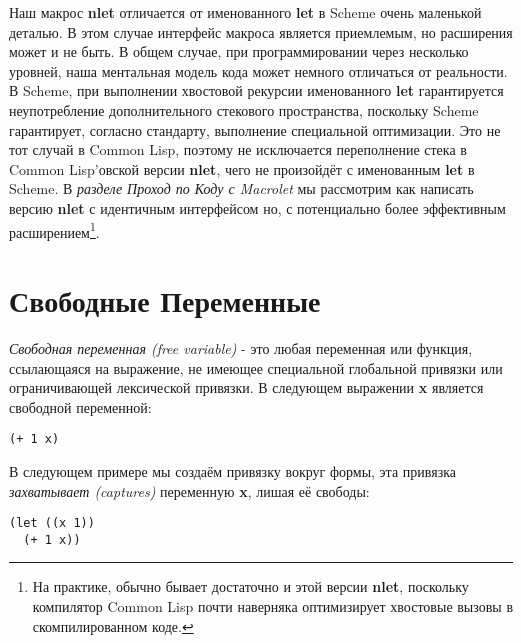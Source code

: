 Наш макрос \textbf{nlet} отличается от именованного \textbf{let} в Scheme очень маленькой деталью. В этом случае интерфейс макроса является приемлемым, но расширения может и не быть. В общем случае, при программировании через несколько уровней, наша ментальная модель кода может немного отличаться от реальности. В Scheme, при выполнении хвостовой рекурсии именованного \textbf{let} гарантируется неупотребление дополнительного стекового пространства, поскольку Scheme гарантирует, согласно стандарту, выполнение специальной оптимизации. Это не тот случай в Common Lisp, поэтому не исключается переполнение стека в Common Lisp'овской версии \textbf{nlet}, чего не произойдёт с именованным \textbf{let} в Scheme. В \emph{разделе Проход по Коду с Macrolet} мы рассмотрим как написать версию \textbf{nlet} с идентичным интерфейсом но, с потенциально более эффективным расширением\footnote{На практике, обычно бывает достаточно и этой версии \textbf{nlet}, поскольку компилятор Common Lisp почти наверняка оптимизирует хвостовые вызовы в скомпилированном коде.}.

\section{Свободные Переменные}\label{section_free_variables}

\emph{Свободная переменная (free variable)} - это любая переменная или функция, ссылающаяся на выражение, не имеющее специальной глобальной привязки или ограничивающей лексической привязки. В следующем выражении \textbf{x} является свободной переменной:

\begin{verbatim}
(+ 1 x)
\end{verbatim}

В следующем примере мы создаём привязку вокруг формы, эта привязка \emph{захватывает (captures)} переменную \textbf{x}, лишая её свободы:

\begin{verbatim}
(let ((x 1))
  (+ 1 x))
\end{verbatim}

